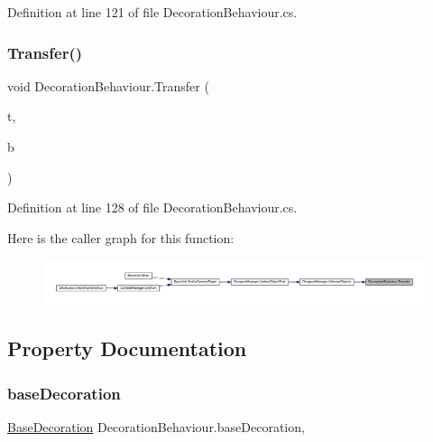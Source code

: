 Definition at line 121 of file Decoration\+Behaviour.\+cs.

\mbox{\label{class_decoration_behaviour_a6f5bef52b05859295759318878ec9a1c}} 
\subsubsection{\texorpdfstring{Transfer()}{Transfer()}}
{\footnotesize\ttfamily void Decoration\+Behaviour.\+Transfer (\begin{DoxyParamCaption}\item[{\mbox{\hyperlink{class_tile}{Tile}}}]{t,  }\item[{\mbox{\hyperlink{class_base_decoration}{Base\+Decoration}}}]{b }\end{DoxyParamCaption})}



Definition at line 128 of file Decoration\+Behaviour.\+cs.

Here is the caller graph for this function\+:
\nopagebreak
\begin{figure}[H]
\begin{center}
\leavevmode
\includegraphics[width=350pt]{class_decoration_behaviour_a6f5bef52b05859295759318878ec9a1c_icgraph}
\end{center}
\end{figure}


\subsection{Property Documentation}
\mbox{\label{class_decoration_behaviour_a2d21a94b61e9200465d4508e0913e51d}} 
\subsubsection{\texorpdfstring{baseDecoration}{baseDecoration}}
{\footnotesize\ttfamily \mbox{\hyperlink{class_base_decoration}{Base\+Decoration}} Decoration\+Behaviour.\+base\+Decoration\hspace{0.3cm}{\ttfamily [get]}, {\ttfamily [set]}}



